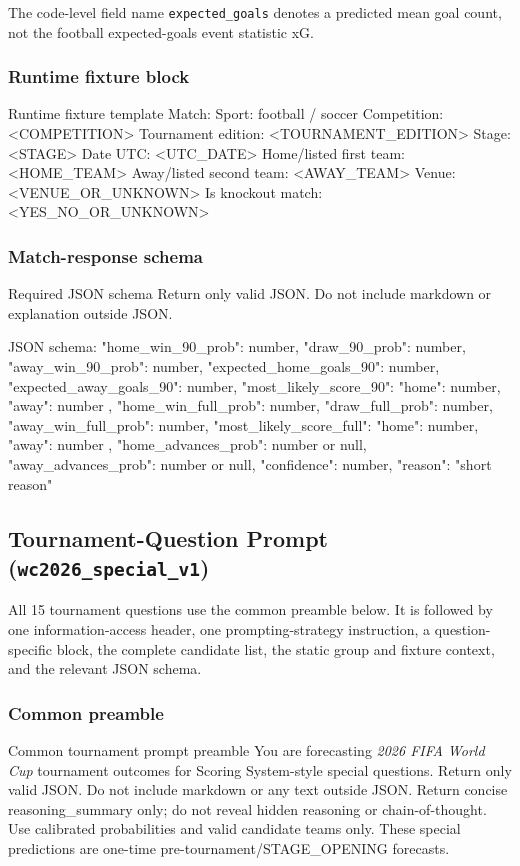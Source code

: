 \documentclass[sigconf,nonacm]{acmart}
\newcommand{\promptheadingbreak}{\leavevmode\par\nopagebreak[4]}
\begin{document}
The code-level field name \texttt{expected\_goals} denotes a predicted mean goal count, not the football expected-goals event statistic xG.

\subsubsection*{Runtime fixture block}
\promptheadingbreak
\begin{promptbox}{Runtime fixture template}
Match:
Sport: football / soccer
Competition: <COMPETITION>
Tournament edition: <TOURNAMENT_EDITION>
Stage: <STAGE>
Date UTC: <UTC_DATE>
Home/listed first team: <HOME_TEAM>
Away/listed second team: <AWAY_TEAM>
Venue: <VENUE_OR_UNKNOWN>
Is knockout match: <YES_NO_OR_UNKNOWN>
\end{promptbox}

\subsubsection*{Match-response schema}
\promptheadingbreak
\begin{promptbox}{Required JSON schema}
Return only valid JSON. Do not include markdown or explanation outside JSON.

JSON schema:
{
  "home_win_90_prob": number,
  "draw_90_prob": number,
  "away_win_90_prob": number,
  "expected_home_goals_90": number,
  "expected_away_goals_90": number,
  "most_likely_score_90": {
    "home": number,
    "away": number
  },
  "home_win_full_prob": number,
  "draw_full_prob": number,
  "away_win_full_prob": number,
  "most_likely_score_full": {
    "home": number,
    "away": number
  },
  "home_advances_prob": number or null,
  "away_advances_prob": number or null,
  "confidence": number,
  "reason": "short reason"
}
\end{promptbox}

\subsection{Tournament-Question Prompt (\texttt{wc2026\_special\_v1})}
\label{appendix:prompts}

All 15 tournament questions use the common preamble below. It is followed by one information-access header, one prompting-strategy instruction, a question-specific block, the complete candidate list, the static group and fixture context, and the relevant JSON schema.

\subsubsection*{Common preamble}
\promptheadingbreak
\begin{promptbox}{Common tournament prompt preamble}
You are forecasting \emph{2026 FIFA World Cup} tournament outcomes for Scoring System-style special questions.
Return only valid JSON. Do not include markdown or any text outside JSON.
Return concise reasoning_summary only; do not reveal hidden reasoning or chain-of-thought.
Use calibrated probabilities and valid candidate teams only.
These special predictions are one-time pre-tournament/STAGE_OPENING forecasts.
\end{promptbox}
\end{document}
